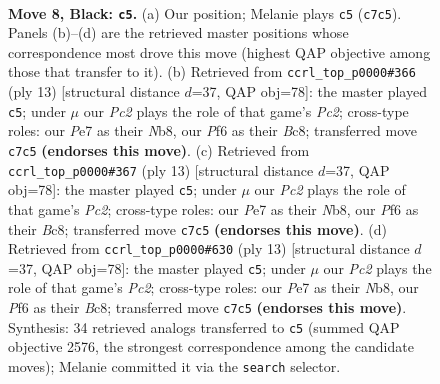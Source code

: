 \documentclass[11pt]{article}
\begin{document}
\begin{figure}[p]\centering
\begin{subfigure}{0.46\textwidth}\centering
\resizebox{\linewidth}{!}{%
\newchessgame
\chessboard[
  setfen={rnbqk2r/ppp1p1bp/5pp1/8/3PP1PP/2P5/P4P2/R1BQKBNR b KQkq - 0 8},
  showmover=false,
  pgfstyle=straightmove, color=movearrow, markmove={c7-c5}
]}
\caption{}
\end{subfigure}\hfill
\begin{subfigure}{0.46\textwidth}\centering
\resizebox{\linewidth}{!}{%
\newchessgame
\chessboard[
  setfen={rnbqk2r/ppp1ppbp/6p1/8/2BPP3/2P5/P4PPP/R1BQK1NR b KQkq - 2 7},
  showmover=false,
  pgfstyle=straightmove, color=movearrow, markmove={c7-c5}
]}
\caption{}
\end{subfigure}
\\[4pt]
\begin{subfigure}{0.46\textwidth}\centering
\resizebox{\linewidth}{!}{%
\newchessgame
\chessboard[
  setfen={rnbqk2r/ppp1ppbp/6p1/8/2BPP3/2P5/P4PPP/R1BQK1NR b KQkq - 2 7},
  showmover=false,
  pgfstyle=straightmove, color=movearrow, markmove={c7-c5}
]}
\caption{}
\end{subfigure}\hfill
\begin{subfigure}{0.46\textwidth}\centering
\resizebox{\linewidth}{!}{%
\newchessgame
\chessboard[
  setfen={rnbqk2r/ppp1ppbp/6p1/8/2BPP3/2P5/P4PPP/R1BQK1NR b KQkq - 2 7},
  showmover=false,
  pgfstyle=straightmove, color=movearrow, markmove={c7-c5}
]}
\caption{}
\end{subfigure}
\caption{\textbf{Move 8, Black: \texttt{c5}.} (a) Our position; Melanie plays \texttt{c5} (\texttt{c7c5}). Panels (b)--(d) are the retrieved master positions whose correspondence most drove this move (highest QAP objective among those that transfer to it). (b) Retrieved from \texttt{ccrl\_top\_p0000\#366} (ply 13) [structural distance $d$=37, QAP obj=78]: the master played \texttt{c5}; under $\mu$ our \emph{Pc2} plays the role of that game's \emph{Pc2}; cross-type roles: our \emph{P}e7 as their \emph{N}b8, our \emph{P}f6 as their \emph{B}c8; transferred move \texttt{c7c5} \textbf{(endorses this move)}. (c) Retrieved from \texttt{ccrl\_top\_p0000\#367} (ply 13) [structural distance $d$=37, QAP obj=78]: the master played \texttt{c5}; under $\mu$ our \emph{Pc2} plays the role of that game's \emph{Pc2}; cross-type roles: our \emph{P}e7 as their \emph{N}b8, our \emph{P}f6 as their \emph{B}c8; transferred move \texttt{c7c5} \textbf{(endorses this move)}. (d) Retrieved from \texttt{ccrl\_top\_p0000\#630} (ply 13) [structural distance $d$=37, QAP obj=78]: the master played \texttt{c5}; under $\mu$ our \emph{Pc2} plays the role of that game's \emph{Pc2}; cross-type roles: our \emph{P}e7 as their \emph{N}b8, our \emph{P}f6 as their \emph{B}c8; transferred move \texttt{c7c5} \textbf{(endorses this move)}. Synthesis: 34 retrieved analogs transferred to \texttt{c5} (summed QAP objective 2576, the strongest correspondence among the candidate moves); Melanie committed it via the \texttt{search} selector.}
\label{fig:thought-m15}
\end{figure}
\end{document}
